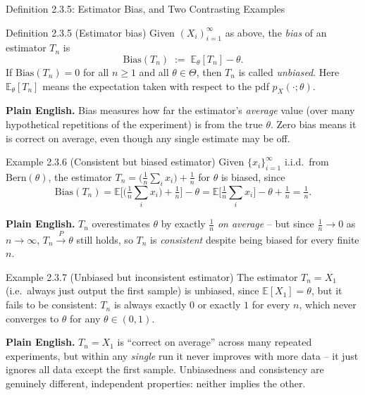 \documentclass[aspectratio=169,10pt]{beamer}
\begin{document}
\begin{frame}[allowframebreaks]{Definition 2.3.5: Estimator Bias, and Two Contrasting Examples}
  \begin{block}{Definition 2.3.5 (Estimator bias)}
    Given $(X_i)_{i=1}^\infty$ as above, the \emph{bias} of an estimator
    $T_n$ is
    \[
      \mathrm{Bias}(T_n) \;:=\; \mathbb{E}_\theta[T_n] - \theta.
    \]
    If $\mathrm{Bias}(T_n)=0$ for all $n\geq 1$ and all $\theta \in \Theta$,
    then $T_n$ is called \emph{unbiased}. Here $\mathbb{E}_\theta[T_n]$
    means the expectation taken with respect to the pdf $p_X(\cdot;\theta)$.
  \end{block}
  \textbf{Plain English.} Bias measures how far the estimator's
  \emph{average} value (over many hypothetical repetitions of the
  experiment) is from the true $\theta$. Zero bias means it is correct on
  average, even though any single estimate may be off.

  \framebreak

  \begin{block}{Example 2.3.6 (Consistent but biased estimator)}
    Given $\{x_i\}_{i=1}^\infty$ i.i.d.\ from $\mathrm{Bern}(\theta)$, the
    estimator $T_n = \big(\frac{1}{n}\sum_i x_i\big) + \frac{1}{n}$ for
    $\theta$ is biased, since
    \[
      \mathrm{Bias}(T_n) = \mathbb{E}\Big[\big(\tfrac{1}{n}\sum_i x_i\big)+\tfrac{1}{n}\Big] - \theta
      = \mathbb{E}\big[\tfrac{1}{n}\sum_i x_i\big] - \theta + \tfrac{1}{n} = \tfrac{1}{n}.
    \]
  \end{block}
  \textbf{Plain English.} $T_n$ overestimates $\theta$ by exactly
  $\frac{1}{n}$ \emph{on average} -- but since $\frac{1}{n} \to 0$ as
  $n \to \infty$, $T_n \xrightarrow{P} \theta$ still holds, so $T_n$ is
  \emph{consistent} despite being biased for every finite $n$.

  \framebreak

  \begin{block}{Example 2.3.7 (Unbiased but inconsistent estimator)}
    The estimator $T_n = X_1$ (i.e.\ always just output the first sample)
    is unbiased, since $\mathbb{E}[X_1]=\theta$, but it fails to be
    consistent: $T_n$ is always exactly $0$ or exactly $1$ for every $n$,
    which never converges to $\theta$ for any $\theta \in (0,1)$.
  \end{block}
  \textbf{Plain English.} $T_n=X_1$ is ``correct on average'' across many
  repeated experiments, but within any \emph{single} run it never improves
  with more data -- it just ignores all data except the first sample.
  Unbiasedness and consistency are genuinely different, independent
  properties: neither implies the other.
\end{frame}
\end{document}
